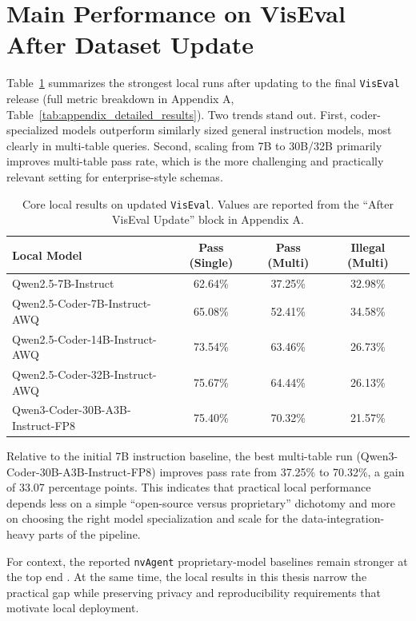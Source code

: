 \documentclass[a4paper,oneside,bibliography=totoc]{scrbook}
\begin{document}
\section{Main Performance on VisEval After Dataset Update}
\label{sec:results_viseval}

Table~\ref{tab:viseval_updated_core} summarizes the strongest local runs after updating to the final \texttt{VisEval} release (full metric breakdown in Appendix A, Table~\ref{tab:appendix_detailed_results}). Two trends stand out. First, coder-specialized models outperform similarly sized general instruction models, most clearly in multi-table queries. Second, scaling from 7B to 30B/32B primarily improves multi-table pass rate, which is the more challenging and practically relevant setting for enterprise-style schemas.

\begin{table}[tb]
  \centering
  \begin{tabular}{lccc}
    \toprule
    \textbf{Local Model} & \textbf{Pass (Single)} & \textbf{Pass (Multi)} & \textbf{Illegal (Multi)} \\
    \midrule
    Qwen2.5-7B-Instruct & 62.64\% & 37.25\% & 32.98\% \\
    Qwen2.5-Coder-7B-Instruct-AWQ & 65.08\% & 52.41\% & 34.58\% \\
    Qwen2.5-Coder-14B-Instruct-AWQ & 73.54\% & 63.46\% & 26.73\% \\
    Qwen2.5-Coder-32B-Instruct-AWQ & 75.67\% & 64.44\% & 26.13\% \\
    Qwen3-Coder-30B-A3B-Instruct-FP8 & 75.40\% & 70.32\% & 21.57\% \\
    \bottomrule
  \end{tabular}
  \caption{Core local results on updated \texttt{VisEval}. Values are reported from the ``After VisEval Update'' block in Appendix A.}
  \label{tab:viseval_updated_core}
\end{table}

Relative to the initial 7B instruction baseline, the best multi-table run (Qwen3-Coder-30B-A3B-Instruct-FP8) improves pass rate from 37.25\% to 70.32\%, a gain of 33.07 percentage points. This indicates that practical local performance depends less on a simple ``open-source versus proprietary'' dichotomy and more on choosing the right model specialization and scale for the data-integration-heavy parts of the pipeline.

For context, the reported \texttt{nvAgent} proprietary-model baselines remain stronger at the top end \cite{ouyang2025nvagent}. At the same time, the local results in this thesis narrow the practical gap while preserving privacy and reproducibility requirements that motivate local deployment.
\end{document}
